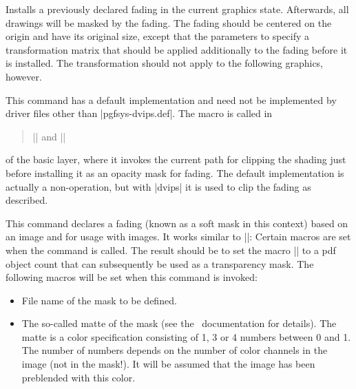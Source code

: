 \begin{command}{\pgfsys@usefading{}}
    Installs a previously declared fading  in the current graphics
    state. Afterwards, all drawings will be masked by the fading. The fading
    should be centered on the origin and have its original size, except that
    the parameters  to  specify a transformation matrix that
    should be applied additionally to the fading before it is installed. The
    transformation should not apply to the following graphics, however.
\end{command}

\pagebreak[2]
\begin{command}{\pgfsys@clipfading}
    This command has a default implementation and need not be implemented by
    driver files other than |pgfsys-dvips.def|. The macro is called
    in
    \begin{quote}
      |\pgfsetfadingforcurrentpath| and |\pgfsetfadingforcurrentpathstroked|
    \end{quote}
    of the basic layer, where it invokes the current path for clipping the
    shading just before installing it as an opacity mask for fading. The
    default implementation is actually a non-operation, but with |dvips| it
    is used to clip the fading as described.
\end{command}

\begin{command}{\pgfsys@definemask}
    This command declares a fading (known as a soft mask in this context) based
    on an image and for usage with images. It works similar to
    |\pgfsys@defineimage|: Certain macros are set when the command is called.
    The result should be to set the macro |\pgf@mask| to a pdf object count
    that can subsequently be used as a transparency mask. The following macros
    will be set when this command is invoked:
    \begin{itemize}
        \item \declare{|\pgf@filename|}
            File name of the mask to be defined.
        \item \declare{|\pgf@maskmatte|}
            The so-called matte of the mask (see the \pdf\ documentation for
            details). The matte is a color specification consisting of 1, 3 or
            4 numbers between 0 and 1. The number of numbers depends on the
            number of color channels in the image (not in the mask!). It will
            be assumed that the image has been preblended with this color.
    \end{itemize}
\end{command}


